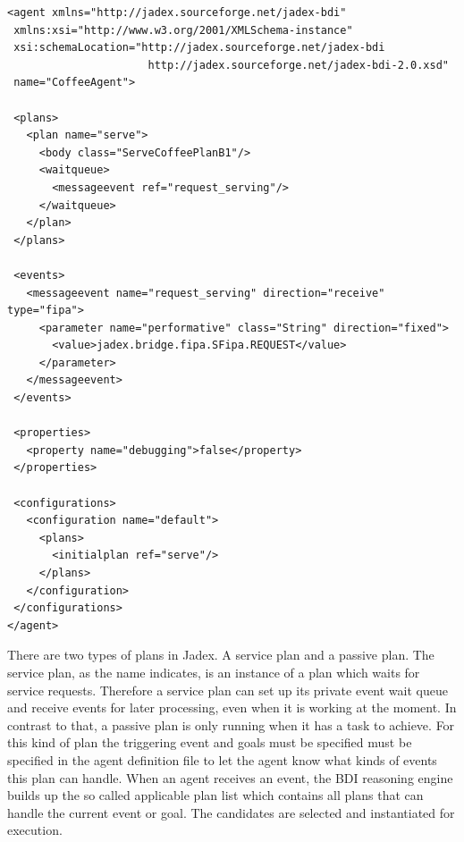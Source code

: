\begin{lstlisting}
<agent xmlns="http://jadex.sourceforge.net/jadex-bdi"
 xmlns:xsi="http://www.w3.org/2001/XMLSchema-instance"
 xsi:schemaLocation="http://jadex.sourceforge.net/jadex-bdi
                      http://jadex.sourceforge.net/jadex-bdi-2.0.xsd"
 name="CoffeeAgent">

 <plans>
   <plan name="serve">
     <body class="ServeCoffeePlanB1"/>
     <waitqueue>
       <messageevent ref="request_serving"/>
     </waitqueue>
   </plan>
 </plans>

 <events>
   <messageevent name="request_serving" direction="receive" type="fipa">
     <parameter name="performative" class="String" direction="fixed">
       <value>jadex.bridge.fipa.SFipa.REQUEST</value>
     </parameter>
   </messageevent>
 </events>

 <properties>
   <property name="debugging">false</property>
 </properties>

 <configurations>
   <configuration name="default">
     <plans>
       <initialplan ref="serve"/>
     </plans>
   </configuration>
 </configurations>
</agent>
\end{lstlisting}
There are two types of plans in Jadex.
A service plan and a passive plan.
The service plan, as the name indicates, is an instance of a plan which waits for service requests.
Therefore a service plan  can set up its private event wait queue and receive events for later processing, even when it is working at the moment.
In contrast to that, a passive plan is only running when it has a task to achieve.
For this kind of plan the triggering event and goals must be specified must be specified in the agent definition file to let the agent know what kinds of events this plan can handle.
When an agent receives an event, the BDI reasoning engine builds up the so called applicable plan list which contains all plans that can handle the current event or goal.
The candidates are selected and instantiated for execution.

